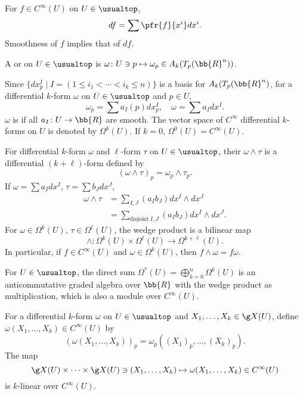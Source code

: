 For $f \in C^\infty(U)$ on $U \in \usualtop$,
\[
df = \sum \pfr{f}{x^i} dx^i.
\]
Smoothness of $f$ implies that of $df$.

A  or  on $U \in \usualtop$ is $\omega \colon U \ni p \mapsto \omega_p \in A_k (T_p(\bb{R}^n))$.

Since $\{ dx^I_p \mid I = (1 \le i_1 < \dotsb < i_k \le n) \}$ is a basis for $A_k (T_p(\bb{R}^n)$, for a differential $k$-form $\omega$ on $U \in \usualtop$ and $p \in U$,
\[
\omega_p = \sum a_I (p) dx^I_p,\quad \omega = \sum a_I dx^I.
\]
$\omega$ is  if all $a_I \colon U \to \bb{R}$ are smooth. The vector space of $C^\infty$  differential $k$-forms on $U$ is denoted by $\Omega^k(U)$. If $k = 0$, $\Omega^0(U) = C^\infty(U)$.

For differential $k$-form $\omega$ and $\ell$-form $\tau$ on $U \in \usualtop$, their  $\omega \wedge \tau$ is a differential $(k+\ell)$-form defined by
\[
(\omega \wedge \tau)_p = \omega_p \wedge \tau_p.
\]
If $\omega = \sum a_I dx^I$, $\tau = \sum b_J dx^J$,
\begin{align*}
\omega \wedge \tau &= \sum_{I,J} (a_I b_J) dx^I \wedge dx^J \\
&= \sum_{\text{disjoint}\ I, J} (a_I b_J) dx^I \wedge dx^J.
\end{align*}
For $\omega \in \Omega^k (U)$, $\tau \in \Omega^\ell (U)$, the wedge product is a bilinear map
\[
\wedge \colon \Omega^k(U) \times \Omega^\ell(U) \to \Omega^{k+\ell}(U).
\]
In particular, if $f \in C^\infty (U)$ and $\omega \in \Omega^k(U)$, then $f \wedge \omega = f \omega$.

For $U \in \usualtop$, the direct sum $\Omega^* (U) = \bigoplus_{k = 0}^n \Omega^k(U)$ is an anticommutative graded algebra over $\bb{R}$ with the wedge product as multiplication, which is also a module over $C^\infty (U)$.


For a differential $k$-form $\omega$ on $U \in \usualtop$ and $X_1, \dotsc, X_k \in \g X(U)$, define $\omega (X_1, \dotsc, X_k) \in C^\infty(U)$ by
\[
(\omega (X_1, \dotsc, X_k))_p = \omega_p ((X_1)_p, \dotsc, (X_k)_p).
\]
The map
\[
\g X(U) \times \dotsm \times \g X(U) \ni (X_1, \dotsc, X_k) \mapsto \omega(X_1, \dotsc, X_k) \in C^\infty(U)
\]
is $k$-linear over $C^\infty(U)$.

